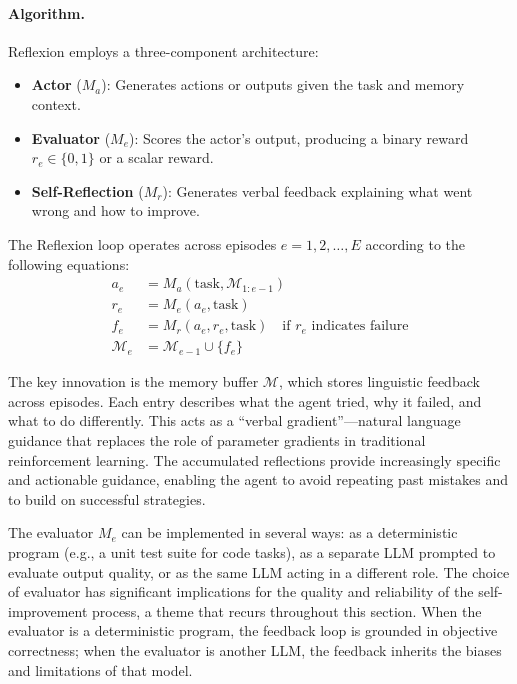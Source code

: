 \paragraph{Algorithm.}
Reflexion employs a three-component architecture:

\begin{itemize}
    \item \textbf{Actor} ($M_a$): Generates actions or outputs given the task and memory context.
    \item \textbf{Evaluator} ($M_e$): Scores the actor's output, producing a binary reward $r_e \in \{0, 1\}$ or a scalar reward.
    \item \textbf{Self-Reflection} ($M_r$): Generates verbal feedback explaining what went wrong and how to improve.
\end{itemize}

The Reflexion loop operates across episodes $e = 1, 2, \ldots, E$ according to the following equations:
\begin{align}
    a_e &= M_a(\text{task}, \mathcal{M}_{1:e-1}) \label{eq:reflexion-actor} \\
    r_e &= M_e(a_e, \text{task}) \label{eq:reflexion-eval} \\
    f_e &= M_r(a_e, r_e, \text{task}) \quad \text{if } r_e \text{ indicates failure} \label{eq:reflexion-reflect} \\
    \mathcal{M}_e &= \mathcal{M}_{e-1} \cup \{f_e\} \label{eq:reflexion-memory}
\end{align}

The key innovation is the memory buffer $\mathcal{M}$, which stores linguistic feedback across episodes. Each entry describes what the agent tried, why it failed, and what to do differently. This acts as a ``verbal gradient''---natural language guidance that replaces the role of parameter gradients in traditional reinforcement learning. The accumulated reflections provide increasingly specific and actionable guidance, enabling the agent to avoid repeating past mistakes and to build on successful strategies.

The evaluator $M_e$ can be implemented in several ways: as a deterministic program (e.g., a unit test suite for code tasks), as a separate LLM prompted to evaluate output quality, or as the same LLM acting in a different role. The choice of evaluator has significant implications for the quality and reliability of the self-improvement process, a theme that recurs throughout this section. When the evaluator is a deterministic program, the feedback loop is grounded in objective correctness; when the evaluator is another LLM, the feedback inherits the biases and limitations of that model.

